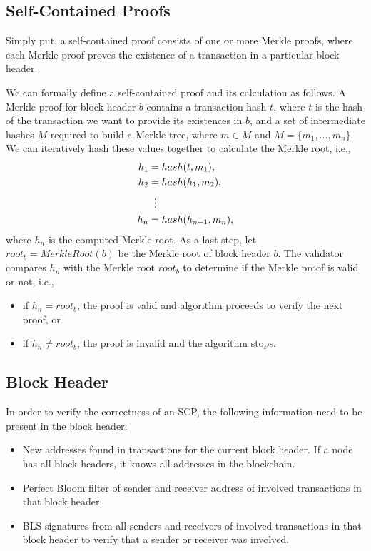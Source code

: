 \documentclass[conference]{IEEEtran}
\begin{document}
\subsection{Self-Contained Proofs}

Simply put, a self-contained proof consists of one or more Merkle proofs, where each Merkle proof proves the existence of a transaction in a particular block header.

We can formally define a self-contained proof and its calculation as follows. A Merkle proof for block header $b$ contains a transaction hash $t$, where $t$ is the hash of the transaction we want to provide its existences in $b$, and a set of intermediate hashes $M$ required to build a Merkle tree, where $m \in M$ and $M = \{m_1, ..., m_n\}$. We can iteratively hash these values together to calculate the Merkle root, i.e.,
\begin{align*}
  h_1 &= hash(t, m_1),\\
  h_2 &= hash(h_1, m_2),\\ 
  &\;\;\vdots \notag \\
  h_n &= hash(h_{n-1}, m_n),
\end{align*}
where $h_n$ is the computed Merkle root. As a last step, let $root_b = MerkleRoot(b)$ be the Merkle root of block header $b$. The validator compares $h_n$ with the Merkle root $root_b$ to determine if the Merkle proof is valid or not, i.e., 
\begin{itemize}
	\item if $h_n = root_b$, the proof is valid and algorithm proceeds to verify the next proof, or
	\item if $h_n \neq root_b$, the proof is invalid and the algorithm stops.
\end{itemize}

\subsection{Block Header} 

In order to verify the correctness of an SCP, the following information need to be present in the block header:
\begin{itemize}
 \item New addresses found in transactions for the current block header. If a node has all block headers, it knows all addresses in the blockchain.
 \item Perfect Bloom filter of sender and receiver address of involved transactions in that block header.
 \item BLS signatures from all senders and receivers of involved transactions in that block header to verify that a sender or receiver was involved.
\end{itemize}
\end{document}
